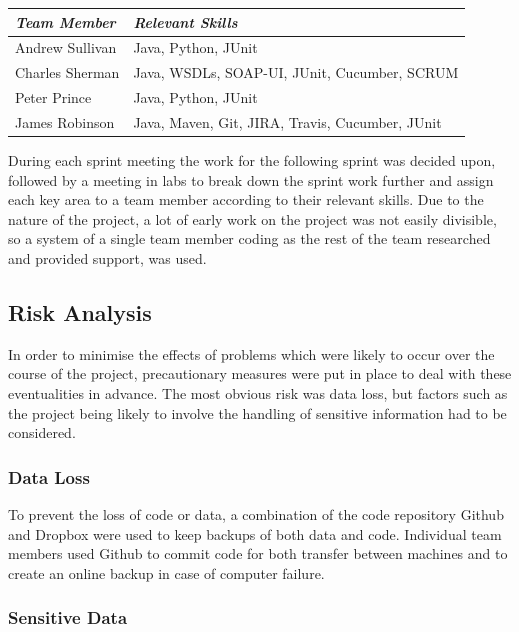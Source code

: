 \documentclass[a4paper, 12pt, twoside]{article}
\begin{document}
\begin{table}[h]
\begin{tabular}{|l|l|}
\hline
\emph{Team Member} & \emph{Relevant Skills}                           \\ \hline
Andrew Sullivan    & Java, Python, JUnit                              \\ \hline
Charles Sherman    & Java, WSDLs, SOAP-UI, JUnit, Cucumber, SCRUM     \\ \hline
Peter Prince       & Java, Python, JUnit                              \\ \hline
James Robinson     & Java, Maven, Git, JIRA, Travis, Cucumber, JUnit  \\ \hline
\end{tabular}
\end{table}

During each sprint meeting the work for the following sprint was decided upon, followed by a meeting in labs to break down the sprint work further and assign each key area to a team member according to their relevant skills. Due to the nature of the project, a lot of early work on the project was not easily divisible, so a system of a single team member coding as the rest of the team researched and provided support, was used.

\subsection{Risk Analysis}
\label{sec:plan_risk_analysis}

In order to minimise the effects of problems which were likely to occur over the course of the project, precautionary measures were put in place to deal with these eventualities in advance. The most obvious risk was data loss, but factors such as the project being likely to involve the handling of sensitive information had to be considered.

\subsubsection{Data Loss}

To prevent the loss of code or data, a combination of the code repository Github and Dropbox were used to keep backups of both data and code. Individual team members used Github to commit code for both transfer between machines and to create an online backup in case of computer failure.

\subsubsection{Sensitive Data}
\end{document}
